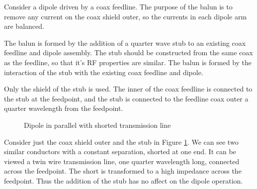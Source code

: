 \documentclass{article}
\begin{document}
Consider a dipole driven by a coax feedline.  The purpose of the balun is to remove any current on the coax shield outer, so the currents in each dipole arm are balanced.

The balun is formed by the addition of a quarter wave stub to an existing coax feedline and dipole assembly.  The stub should be constructed from the same coax as the feedline, so that it's RF properties are similar.  The balun is formed by the interaction of the stub with the existing coax feedline and dipole.

Only the shield of the stub is used.  The inner of the coax feedline is connected to the stub at the feedpoint, and the stub is connected to the feedline coax outer a quarter wavelength from the feedpoint.

\begin{figure}[h]
\caption{Dipole in parallel with shorted transmission line}
\label{fig:shorted}
\vspace{5mm}
\centering
{}
\end{figure}

Consider just the coax shield outer and the stub in Figure \ref{fig:shorted}.  We can see two similar conductors with a constant separation, shorted at one end.  It can be viewed a twin wire transmission line, one quarter wavelength long, connected across the feedpoint.  The short is transformed to a high impedance across the feedpoint. Thus the addition of the stub has no affect on the dipole operation.
\end{document}
